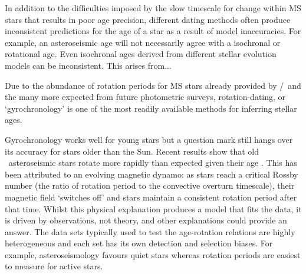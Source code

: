 In addition to the difficulties imposed by the slow timescale for change
within MS stars that results in poor age precision, different dating methods
often produce inconsistent predictions for the age of a star as a result of
model inaccuracies.
For example, an asteroseismic age will not necessarily agree with a isochronal
or rotational age.
Even isochronal ages derived from different stellar evolution models can be
inconsistent.
This arises from...




Due to the abundance of rotation periods for MS stars already provided by
\kepler/\ktwo\ and the many more expected from future photometric surveys,
rotation-dating, or `gyrochronology' is one of the most readily available
methods for inferring stellar ages.

Gyrochronology works well for young stars but a question mark still hangs over
its accuracy for stars older than the Sun.
Recent results show that old \kepler\ asteroseismic stars rotate more rapidly
than expected given their age \citep[\eg][]{Angus2015, Vansaders2016,
Metcalfe2016}.
This has been attributed to an evolving magnetic dynamo: as stars reach a
critical Rossby number (the ratio of rotation period to the convective
overturn timescale), their magnetic field `switches off' and stars maintain a
consistent rotation period after that time.
Whilst this physical explanation produces a model that fits the data, it is
driven by observations, not theory, and other explanations could provide an
answer.
The data sets typically used to test the age-rotation relations are highly
heterogeneous and each set has its own detection and selection biases.
For example, asteroseismology favours quiet stars whereas rotation periods are
easiest to measure for active stars.

